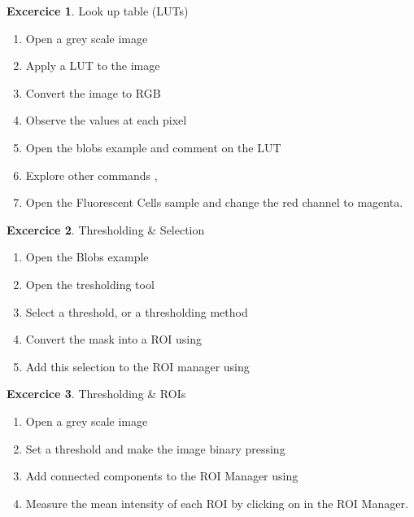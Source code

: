 \documentclass[xcolor=table]{scrartcl}
\theoremstyle{definition}
\newtheorem{exercice}{Excercice}
\begin{document}
\begin{exercice} Look up table (LUTs)
  \begin{enumerate}
  \item Open a grey scale image 
  \item Apply a LUT to the image 
  \item Convert the image to RGB 
  \item Observe the values at each pixel
  \item Open the blobs example  and
    comment on the LUT
  \item Explore other commands ,
  \item Open the Fluorescent Cells sample and change the red channel
    to magenta.
  \end{enumerate}
\end{exercice}

\begin{exercice} Thresholding \& Selection
  \begin{enumerate}
  \item Open the Blobs example 
  \item Open the tresholding tool 
  \item Select a threshold, or a thresholding method
  \item Convert the mask into a ROI using 
  \item Add this selection to the ROI manager using 
  \end{enumerate}
\end{exercice}

\begin{exercice} Thresholding \& ROIs
  \begin{enumerate}
  \item Open a grey scale image
  \item Set a threshold and make the image binary pressing
  \item Add connected components to the ROI Manager using 
  \item Measure the mean intensity of each ROI by clicking on  in the ROI Manager.
  \end{enumerate}
\end{exercice}
\end{document}
